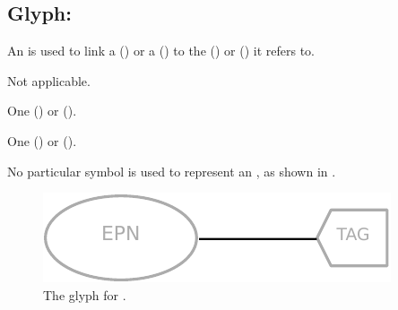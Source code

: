\subsection{Glyph:  }\label{sec:equivalenceArc}

An  is used to link a  () or a  () to the  () or  () it refers to.

\begin{glyphDescription}

\glyphSboTerm
Not applicable.

\glyphOrigin
One  () or  ().

\glyphTarget
One  () or  ().

\glyphSymbol No particular symbol is used to represent an , as shown in .
 \end{glyphDescription}

\begin{figure}[H]
  \centering
  \includegraphics[scale = 0.8]{images/build/equivalence_arc.pdf}
  \caption{The \PD glyph for .}
  \label{fig:equivalenceArc}
\end{figure}
